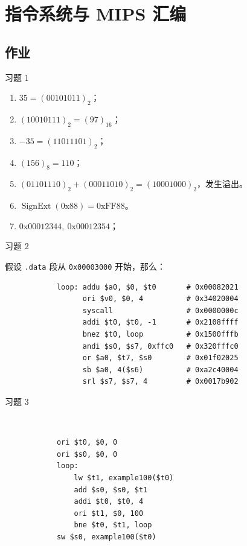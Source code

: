 \section{指令系统与 MIPS 汇编}

\subsection{作业}

\begin{problem}
    习题 1
    \begin{solution}
        \begin{enumerate}
            \item[\textbf{a)}] $35 = (00101011)_2$；
            \item[\textbf{b)}] $(10010111)_2 = (\mathrm{97})_{16}$；
            \item[\textbf{c)}] $-35 = (11011101)_2$；
            \item[\textbf{d)}] $(156)_8 = 110$；
            \item[\textbf{e)}] $(01101110)_2 + (00011010)_2 = (10001000)_2$，发生溢出。
            \item[\textbf{f)}] $\operatorname{SignExt}(\mathrm{0x88}) = \mathrm{0xFF88}$。
            \item[\textbf{g)}] $\mathrm{0x00012344},\ \mathrm{0x00012354}$；
        \end{enumerate}
    \end{solution}
\end{problem}

\begin{problem}
    习题 2
    \begin{solution}
        假设 \texttt{.data} 段从 \texttt{0x00003000} 开始，那么：
        \begin{verbatim}
            loop: addu $a0, $0, $t0       # 0x00082021
                  ori $v0, $0, 4          # 0x34020004
                  syscall                 # 0x0000000c
                  addi $t0, $t0, -1       # 0x2108ffff
                  bnez $t0, loop          # 0x1500fffb
                  andi $s0, $s7, 0xffc0   # 0x320fffc0
                  or $a0, $t7, $s0        # 0x01f02025
                  sb $a0, 4($s6)          # 0xa2c40004
                  srl $s7, $s7, 4         # 0x0017b902
        \end{verbatim}
    \end{solution}
\end{problem}

\begin{problem}
    习题 3
    \begin{solution}
        \ 
        \begin{verbatim}
            ori $t0, $0, 0
            ori $s0, $0, 0
            loop:
                lw $t1, example100($t0)
                add $s0, $s0, $t1
                addi $t0, $t0, 4
                ori $t1, $0, 100
                bne $t0, $t1, loop
            sw $s0, example100($t0)
        \end{verbatim}
    \end{solution}
\end{problem}

